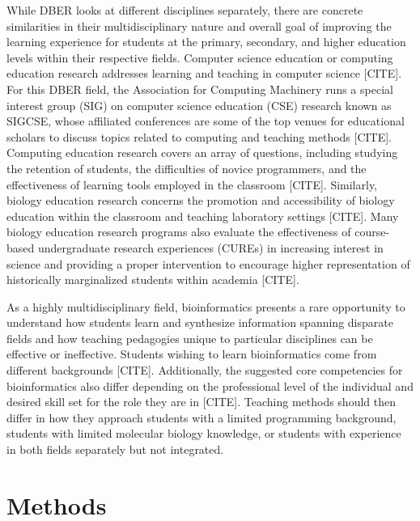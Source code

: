 While DBER looks at different disciplines separately, there are concrete similarities in their multidisciplinary nature and overall goal of improving the learning experience for students at the primary, secondary, and higher education levels within their respective fields. Computer science education or computing education research addresses learning and teaching in computer science [CITE]. For this DBER field, the Association for Computing Machinery runs a special interest group (SIG) on computer science education (CSE) research known as SIGCSE, whose affiliated conferences are some of the top venues for educational scholars to discuss topics related to computing and teaching methods [CITE]. Computing education research covers an array of questions, including studying the retention of students, the difficulties of novice programmers, and the effectiveness of learning tools employed in the classroom [CITE]. Similarly, biology education research concerns the promotion and accessibility of biology education within the classroom and teaching laboratory settings [CITE]. Many biology education research programs also evaluate the effectiveness of course-based undergraduate research experiences (CUREs) in increasing interest in science and providing a proper intervention to encourage higher representation of historically marginalized students within academia [CITE]. 

As a highly multidisciplinary field, bioinformatics presents a rare opportunity to understand how students learn and synthesize information spanning disparate fields and how teaching pedagogies unique to particular disciplines can be effective or ineffective. Students wishing to learn bioinformatics come from different backgrounds [CITE]. Additionally, the suggested core competencies for bioinformatics also differ depending on the professional level of the individual and desired skill set for the role they are in [CITE]. Teaching methods should then differ in how they approach students with a limited programming background, students with limited molecular biology knowledge, or students with experience in both fields separately but not integrated.  

\section{Methods}

